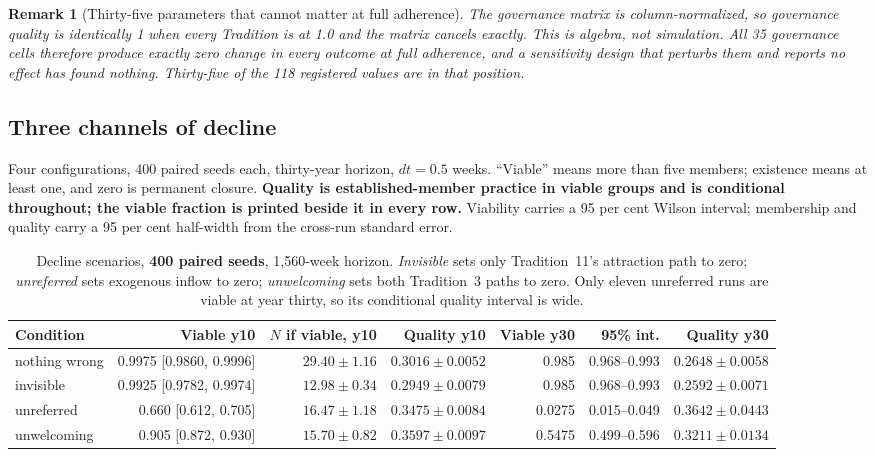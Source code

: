 \documentclass[11pt,a4paper]{article}
\newtheorem{remark}{Remark}
\begin{document}
\begin{remark}[Thirty-five parameters that cannot matter at full adherence]
The governance matrix is column-normalized, so governance quality is identically 1
when every Tradition is at 1.0 and the matrix cancels exactly. This is algebra,
not simulation. All 35 governance cells therefore produce exactly zero change in
every outcome at full adherence, and a sensitivity design that perturbs them and
reports no effect has found nothing. Thirty-five of the 118 registered values are in that
position.
\end{remark}

\subsection{Three channels of decline}

Four configurations, 400 paired seeds each, thirty-year horizon, $dt = 0.5$ weeks.
``Viable'' means more than five members; existence means at least one, and zero is
permanent closure. \textbf{Quality is established-member practice in viable groups
and is conditional throughout; the viable fraction is printed beside it in every
row.} Viability carries a 95 per cent Wilson
interval; membership and quality carry a 95 per cent half-width from the cross-run
standard error.

\begin{table}[htbp]\centering\scriptsize
\setlength{\tabcolsep}{4pt}
\begin{tabular}{@{}lrrrrrr@{}}
\toprule
Condition & Viable y10 & $N$ if viable, y10 & Quality y10 & Viable y30 & 95\% int. & Quality y30 \\
\midrule
nothing wrong & 0.9975 [0.9860, 0.9996] & $29.40 \pm 1.16$ & $0.3016 \pm 0.0052$ & 0.985 & 0.968--0.993 & $0.2648 \pm 0.0058$ \\
invisible     & 0.9925 [0.9782, 0.9974] & $12.98 \pm 0.34$ & $0.2949 \pm 0.0079$ & 0.985 & 0.968--0.993 & $0.2592 \pm 0.0071$ \\
unreferred    & 0.660 [0.612, 0.705] & $16.47 \pm 1.18$ & $0.3475 \pm 0.0084$ & 0.0275 & 0.015--0.049 & $0.3642 \pm 0.0443$ \\
unwelcoming   & 0.905 [0.872, 0.930] & $15.70 \pm 0.82$ & $0.3597 \pm 0.0097$ & 0.5475 & 0.499--0.596 & $0.3211 \pm 0.0134$ \\
\bottomrule
\end{tabular}
\caption{Decline scenarios, \textbf{400 paired seeds}, 1,560-week horizon.
\emph{Invisible} sets only Tradition~11's attraction path to zero;
\emph{unreferred} sets exogenous inflow to zero; \emph{unwelcoming} sets
both Tradition~3 paths to zero. Only eleven unreferred runs are viable at year
thirty, so its conditional quality interval is wide.}
\label{tab:decline}
\end{table}
\end{document}
